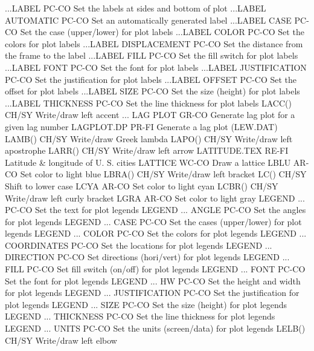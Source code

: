 ...LABEL                    PC-CO Set the labels at sides and bottom of plot
...LABEL AUTOMATIC          PC-CO Set an automatically generated label
...LABEL CASE               PC-CO Set the case (upper/lower) for plot labels
...LABEL COLOR              PC-CO Set the colors for plot labels
...LABEL DISPLACEMENT       PC-CO Set the distance from the frame to the label
...LABEL FILL               PC-CO Set the fill switch for plot labels
...LABEL FONT               PC-CO Set the font for plot labels
...LABEL JUSTIFICATION      PC-CO Set the justification for plot labels
...LABEL OFFSET             PC-CO Set the offset for plot labels
...LABEL SIZE               PC-CO Set the size (height) for plot labels
...LABEL THICKNESS          PC-CO Set the line thickness for plot labels
LACC()                      CH/SY Write/draw left accent
... LAG PLOT                GR-CO Generate lag plot for a given lag number
LAGPLOT.DP                  PR-FI Generate a lag plot (LEW.DAT)
LAMB()                      CH/SY Write/draw Greek lambda
LAPO()                      CH/SY Write/draw left apostrophe
LARR()                      CH/SY Write/draw left arrow
LATITUDE.TEX                RE-FI Latitude & longitude of U. S. cities
LATTICE                     WC-CO Draw a lattice
LBLU                        AR-CO Set color to light blue
LBRA()                      CH/SY Write/draw left bracket
LC()                        CH/SY Shift to lower case
LCYA                        AR-CO Set color to light cyan
LCBR()                      CH/SY Write/draw left curly bracket
LGRA                        AR-CO Set color to light gray
LEGEND ...                  PC-CO Set the text for plot legends
LEGEND ... ANGLE            PC-CO Set the angles for plot legends
LEGEND ... CASE             PC-CO Set the cases (upper/lower) for plot legends
LEGEND ... COLOR            PC-CO Set the colors for plot legends
LEGEND ... COORDINATES      PC-CO Set the locations for plot legends
LEGEND ... DIRECTION        PC-CO Set directions (hori/vert) for plot legends
LEGEND ... FILL             PC-CO Set fill switch (on/off) for plot legends
LEGEND ... FONT             PC-CO Set the font for plot legends
LEGEND ... HW               PC-CO Set the height and width for plot legends
LEGEND ... JUSTIFICATION    PC-CO Set the justification for plot legends
LEGEND ... SIZE             PC-CO Set the size (height) for plot legends
LEGEND ... THICKNESS        PC-CO Set the line thickness for plot legends
LEGEND ... UNITS            PC-CO Set the units (screen/data) for plot legends
LELB()                      CH/SY Write/draw left elbow
